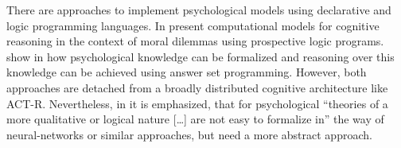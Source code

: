There are approaches to implement psychological models using declarative and logic programming languages. In \cite{pereira_modellingmorality_2007} \citeauthor{pereira_modellingmorality_2007} present computational models for cognitive reasoning in the context of moral dilemmas using prospective logic programs. \citeauthor{balduccini_formalization_2010} show in \cite{balduccini_formalization_2010} how psychological knowledge can be formalized and reasoning over this knowledge can be achieved using answer set programming. However, both approaches are detached from a broadly distributed cognitive architecture like ACT-R. Nevertheless, in \cite[726]{balduccini_formalization_2010} it is emphasized, that for psychological ``theories of a more qualitative or logical nature [\dots] are not easy to formalize in'' the way of neural-networks or similar approaches, but need a more abstract approach.
